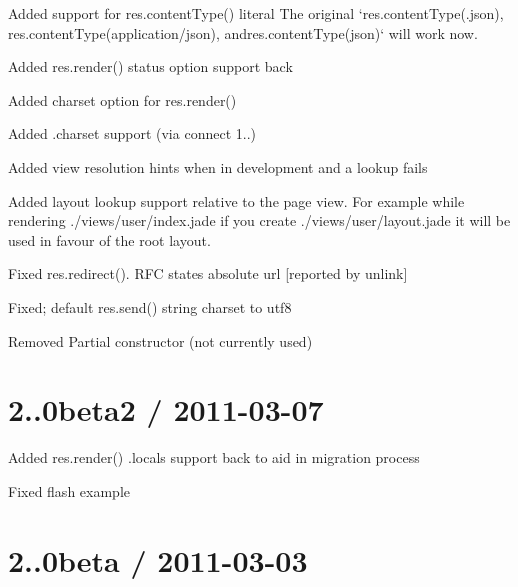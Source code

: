 \begin{DoxyItemize}
\item Added support for {\ttfamily res.\+content\+Type()} literal The original `res.content\+Type(\textquotesingle{}.json\textquotesingle{}){\ttfamily , }res.\+content\+Type(\textquotesingle{}application/json\textquotesingle{}){\ttfamily , and}res.\+content\+Type(\textquotesingle{}json\textquotesingle{})` will work now.
\item Added {\ttfamily res.\+render()} status option support back
\item Added charset option for {\ttfamily res.\+render()}
\item Added {\ttfamily .charset} support (via connect 1..)
\item Added view resolution hints when in development and a lookup fails
\item Added layout lookup support relative to the page view. For example while rendering {\ttfamily ./views/user/index.jade} if you create {\ttfamily ./views/user/layout.jade} it will be used in favour of the root layout.
\item Fixed {\ttfamily res.\+redirect()}. R\+F\+C states absolute url \mbox{[}reported by unlink\mbox{]}
\item Fixed; default {\ttfamily res.\+send()} string charset to utf8
\item Removed {\ttfamily Partial} constructor (not currently used)
\end{DoxyItemize}

\section*{2..\+0beta2 / 2011-\/03-\/07 }


\begin{DoxyItemize}
\item Added res.\+render() {\ttfamily .locals} support back to aid in migration process
\item Fixed flash example
\end{DoxyItemize}

\section*{2..\+0beta / 2011-\/03-\/03 }


